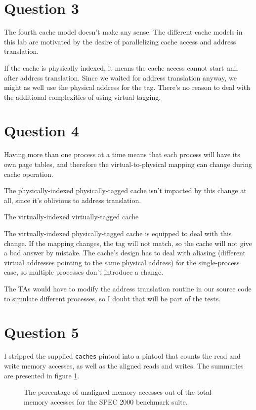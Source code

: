 \section{Question 3}
The fourth cache model doesn't make any sense. The different cache models in
this lab are motivated by the desire of parallelizing cache access and address
translation.

If the cache is physically indexed, it means the cache access cannot start unil
after address translation. Since we waited for address translation anyway, we
might as well use the physical address for the tag. There's no reason to deal
with the additional complexities of using virtual tagging.

\section{Question 4}
Having more than one process at a time means that each process will have its
own page tables, and therefore the virtual-to-physical mapping can change
during cache operation.

The physically-indexed physically-tagged cache isn't impacted by this change at
all, since it's oblivious to address translation.

The virtually-indexed virtually-tagged cache 

The virtually-indexed physically-tagged cache is equipped to deal with this
change. If the mapping changes, the tag will not match, so the cache will not
give a bad answer by mistake. The cache's design has to deal with aliasing
(different virtual addresses pointing to the same physical address) for the
single-process case, so multiple processes don't introduce a change.

The TAs would have to modify the address translation routine in our source code
to simulate different processes, so I doubt that will be part of the tests. 

\section{Question 5}

I stripped the supplied \texttt{caches} pintool into a pintool that counts the
read and write memory accesses, as well as the aligned reads and writes. The
summaries are presented in figure \ref{q5:unaligned_accesses}.

\begin{figure}[htb]
\center

\caption{The percentage of unaligned memory accesses out of the total memory
accesses for the SPEC 2000 benchmark suite. }
\label{q5:unaligned_accesses}
\end{figure}

